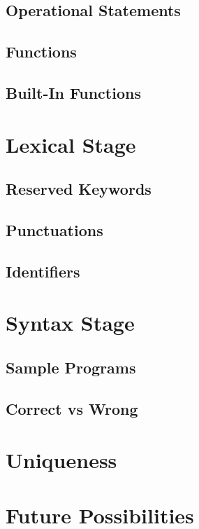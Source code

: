 \documentclass{article}
\begin{document}
\subsection{Operational Statements}
\subsection{Functions}
\subsection{Built-In Functions}

\section{Lexical Stage}
\subsection{Reserved Keywords}
\subsection{Punctuations}
\subsection{Identifiers}

\section{Syntax Stage}
\subsection{Sample Programs}
\subsection{Correct vs Wrong}

\section{Uniqueness}
\section{Future Possibilities}
\end{document}
